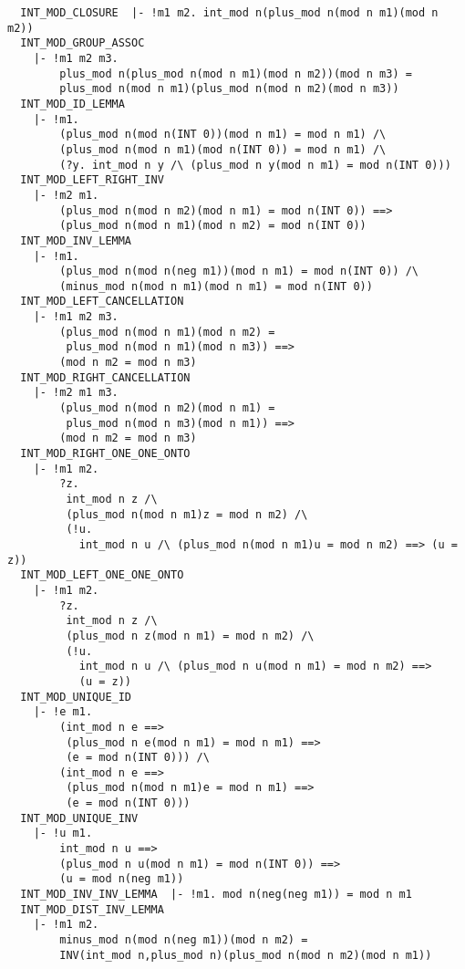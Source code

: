 \begin{verbatim}
  INT_MOD_CLOSURE  |- !m1 m2. int_mod n(plus_mod n(mod n m1)(mod n m2))
  INT_MOD_GROUP_ASSOC
    |- !m1 m2 m3.
        plus_mod n(plus_mod n(mod n m1)(mod n m2))(mod n m3) =
        plus_mod n(mod n m1)(plus_mod n(mod n m2)(mod n m3))
  INT_MOD_ID_LEMMA
    |- !m1.
        (plus_mod n(mod n(INT 0))(mod n m1) = mod n m1) /\
        (plus_mod n(mod n m1)(mod n(INT 0)) = mod n m1) /\
        (?y. int_mod n y /\ (plus_mod n y(mod n m1) = mod n(INT 0)))
  INT_MOD_LEFT_RIGHT_INV
    |- !m2 m1.
        (plus_mod n(mod n m2)(mod n m1) = mod n(INT 0)) ==>
        (plus_mod n(mod n m1)(mod n m2) = mod n(INT 0))
  INT_MOD_INV_LEMMA
    |- !m1.
        (plus_mod n(mod n(neg m1))(mod n m1) = mod n(INT 0)) /\
        (minus_mod n(mod n m1)(mod n m1) = mod n(INT 0))
  INT_MOD_LEFT_CANCELLATION
    |- !m1 m2 m3.
        (plus_mod n(mod n m1)(mod n m2) =
         plus_mod n(mod n m1)(mod n m3)) ==>
        (mod n m2 = mod n m3)
  INT_MOD_RIGHT_CANCELLATION
    |- !m2 m1 m3.
        (plus_mod n(mod n m2)(mod n m1) =
         plus_mod n(mod n m3)(mod n m1)) ==>
        (mod n m2 = mod n m3)
  INT_MOD_RIGHT_ONE_ONE_ONTO
    |- !m1 m2.
        ?z.
         int_mod n z /\
         (plus_mod n(mod n m1)z = mod n m2) /\
         (!u.
           int_mod n u /\ (plus_mod n(mod n m1)u = mod n m2) ==> (u = z))
  INT_MOD_LEFT_ONE_ONE_ONTO
    |- !m1 m2.
        ?z.
         int_mod n z /\
         (plus_mod n z(mod n m1) = mod n m2) /\
         (!u.
           int_mod n u /\ (plus_mod n u(mod n m1) = mod n m2) ==>
           (u = z))
  INT_MOD_UNIQUE_ID
    |- !e m1.
        (int_mod n e ==>
         (plus_mod n e(mod n m1) = mod n m1) ==>
         (e = mod n(INT 0))) /\
        (int_mod n e ==>
         (plus_mod n(mod n m1)e = mod n m1) ==>
         (e = mod n(INT 0)))
  INT_MOD_UNIQUE_INV
    |- !u m1.
        int_mod n u ==>
        (plus_mod n u(mod n m1) = mod n(INT 0)) ==>
        (u = mod n(neg m1))
  INT_MOD_INV_INV_LEMMA  |- !m1. mod n(neg(neg m1)) = mod n m1
  INT_MOD_DIST_INV_LEMMA
    |- !m1 m2.
        minus_mod n(mod n(neg m1))(mod n m2) =
        INV(int_mod n,plus_mod n)(plus_mod n(mod n m2)(mod n m1))
\end{verbatim} 

